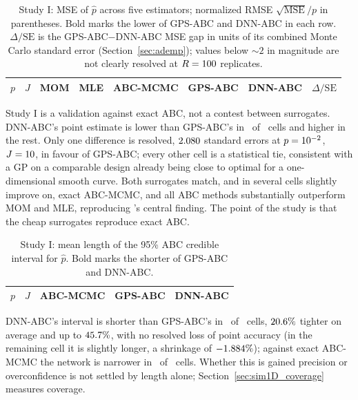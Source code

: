 \documentclass[sn-basic,iicol,pdflatex]{sn-jnl}
\begin{document}
\begin{table}[t]
\centering
\caption{Study I: MSE of $\hat p$ across five estimators; normalized
RMSE $\sqrt{\mathrm{MSE}}/p$ in parentheses. Bold marks the lower of GPS-ABC
and DNN-ABC in each row. $\Delta/\mathrm{SE}$ is the GPS-ABC$-$DNN-ABC MSE gap
in units of its combined Monte Carlo standard error (Section~\ref{sec:ademp});
values below $\sim 2$ in magnitude are not clearly resolved at $R=100$
replicates.}
\label{tab:mse1D}
{\small
\begin{tabular}{rrrrrrrr}
\toprule
$p$ & $J$ & MOM & MLE & ABC-MCMC & GPS-ABC & DNN-ABC & $\Delta/\mathrm{SE}$ \\
\midrule

\end{tabular}}
\end{table}

Study I is a validation against exact ABC, not a contest between surrogates. DNN-ABC's point estimate is lower than GPS-ABC's in \soneNDnnMseLower\ of \soneNCells\ cells and higher in the rest.
Only one difference is resolved, $2.080$ standard errors at $p=10^{-2}$, $J=10$, in favour of GPS-ABC; every other cell is a statistical tie, consistent with a GP on a comparable
design already being close to optimal for a one-dimensional smooth curve. Both surrogates match, and in several cells slightly improve on, exact ABC-MCMC, and all ABC methods substantially outperform
MOM and MLE, reproducing \citeauthor{lu2023}'s central finding. The point of the study is that the cheap surrogates reproduce exact ABC.


\begin{table}[t]
\centering
\caption{Study I: mean length of the 95\% ABC credible interval for
$\hat p$. Bold marks the shorter of GPS-ABC and DNN-ABC.}
\label{tab:ci1D}
\begin{tabular}{rrrrr}
\toprule
$p$ & $J$ & ABC-MCMC & GPS-ABC & DNN-ABC \\
\midrule

\end{tabular}
\end{table}

DNN-ABC's interval is shorter than GPS-ABC's in \soneNCiShorterThanGps\ of \soneNCells\ cells, $20.6\%$ tighter on average and up to $45.7\%$, with no resolved loss of point accuracy
(in the remaining cell it is slightly longer, a shrinkage of $-1.884\%$); against exact ABC-MCMC the network is narrower in \soneNCiNarrowerThanAbc\ of \soneNCells\ cells. Whether this is
gained precision or overconfidence is not settled by length alone; Section~\ref{sec:sim1D_coverage} measures coverage.
\end{document}
